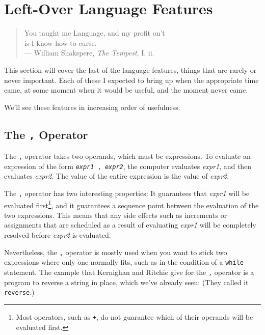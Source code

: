 %
%
%
\section{Left-Over Language Features}


\begin{center}
\begin{quote}
{You taught me Language, and my profit on't \\
is I know how to curse.} \\

{\small --- William Shakspere, {\em The Tempest}, I, ii.}
\end{quote}
\end{center}

This section will cover the last of the language features, things that
are rarely or never important.  Each of these I expected to bring up
when the appropriate time came, at some moment when it would be useful,
and the moment never came.

We'll see these features in increasing order of usefulness.

\subsection{The {\tt ,} Operator}

The {\tt ,} operator takes two operands, which must be expressions.  To
evaluate an expression of the form {\tt {\em expr1} , {\em expr2}}, the
computer evaluates {\em expr1}\/, and then evaluates {\em expr2}\/.  The
value of the entire expression is the value of {\em expr2}\/.  

The {\tt ,} operator has two interesting properties: It guarantees that
{\em expr1}\/ will be evaluated first\footnote{Most operators, such as
{\tt +}, do not guarantee which of their operands will be evaluated
first.}, and it guarantees a sequence point between the evaluation of
the two expressions.  This means that any side effects such as
increments or assignments that are scheduled as a result of evaluating
{\em expr1} will be completely resolved before {\em expr2}\/ is
evaluated.

Nevertheless, the {\tt ,} operator is mostly used when you want to stick
two expressions where only one normally fits, such as in the condition
of a {\tt while} statement.  The example that Kernighan and Ritchie give
for the {\tt ,} operator is a program to reverse a string in place,
which we've already seen:  (They called it {\tt reverse}.)

